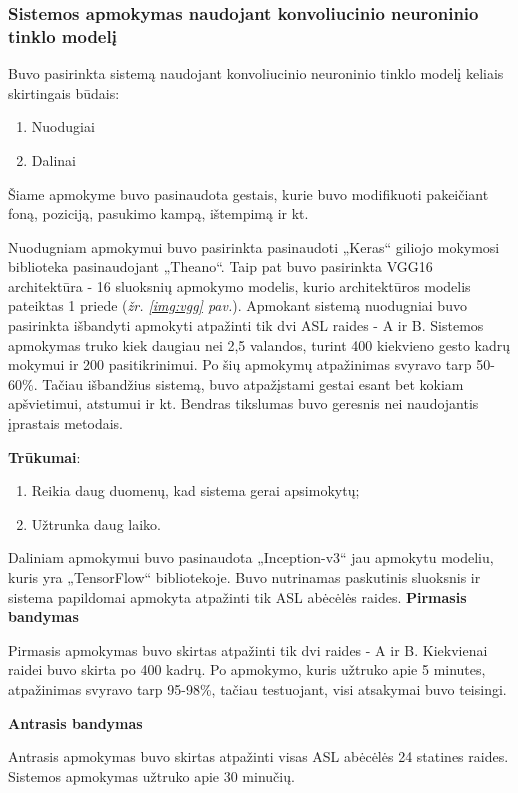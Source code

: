 \documentclass{VUMIFInfKursinis}
\begin{document}
\subsubsection{Sistemos apmokymas naudojant konvoliucinio neuroninio tinklo modelį}

Buvo pasirinkta sistemą naudojant konvoliucinio neuroninio tinklo modelį keliais skirtingais būdais:
\begin{enumerate}
	\item Nuodugiai
	\item Dalinai
\end{enumerate}
Šiame apmokyme buvo pasinaudota gestais, kurie buvo modifikuoti pakeičiant foną, poziciją, pasukimo kampą, ištempimą ir kt.


Nuodugniam apmokymui buvo pasirinkta pasinaudoti „Keras“ giliojo mokymosi biblioteka pasinaudojant „Theano“. Taip pat buvo pasirinkta VGG16 architektūra - 16 sluoksnių apmokymo modelis, kurio architektūros modelis pateiktas 1 priede (\textit{žr. \ref{img:vgg} pav.}). Apmokant sistemą nuodugniai buvo pasirinkta išbandyti apmokyti atpažinti tik dvi ASL raides - A ir B. Sistemos apmokymas truko kiek daugiau nei 2,5 valandos, turint 400 kiekvieno gesto kadrų mokymui ir 200 pasitikrinimui. Po šių apmokymų atpažinimas svyravo tarp 50-60\%. Tačiau išbandžius sistemą, buvo atpažįstami gestai esant bet kokiam apšvietimui, atstumui ir kt. Bendras tikslumas buvo geresnis nei naudojantis įprastais metodais.

\textbf{Trūkumai}:
\begin{enumerate}
	\item Reikia daug duomenų, kad sistema gerai apsimokytų;
	\item Užtrunka daug laiko.
\end{enumerate}

Daliniam apmokymui buvo pasinaudota „Inception-v3“ jau apmokytu modeliu, kuris yra „TensorFlow“ bibliotekoje. Buvo nutrinamas paskutinis sluoksnis ir sistema papildomai apmokyta atpažinti tik ASL abėcėlės raides. 
\textbf{Pirmasis bandymas}

Pirmasis apmokymas buvo skirtas atpažinti tik dvi raides - A ir B. Kiekvienai raidei buvo skirta po 400 kadrų. Po apmokymo, kuris užtruko apie 5 minutes, atpažinimas svyravo tarp 95-98\%, tačiau testuojant, visi atsakymai buvo teisingi.

\textbf{Antrasis bandymas}

Antrasis apmokymas buvo skirtas atpažinti visas ASL abėcėlės 24 statines raides. Sistemos apmokymas užtruko apie 30 minučių.
\end{document}
